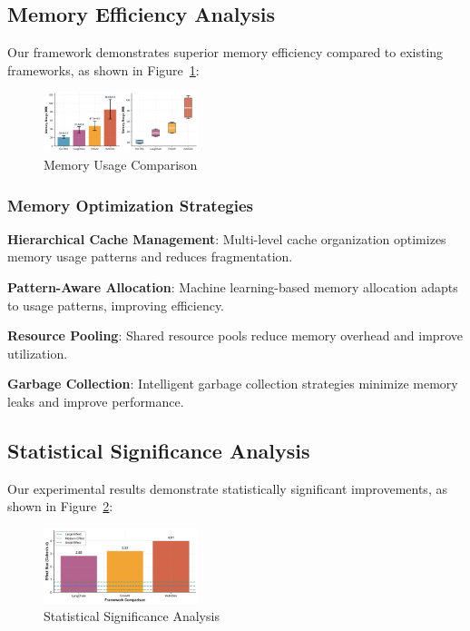 \documentclass[conference]{IEEEtran}
\begin{document}
\subsection{Memory Efficiency Analysis}

Our framework demonstrates superior memory efficiency compared to existing frameworks, as shown in Figure~\ref{fig:memory1}:

\begin{figure}[htbp]
\centering
\includegraphics[width=0.4\textwidth]{figures/images/memory_comparison.png}
\caption{Memory Usage Comparison}
\label{fig:memory1}
\end{figure}

\subsubsection{Memory Optimization Strategies}

\textbf{Hierarchical Cache Management}: Multi-level cache organization optimizes memory usage patterns and reduces fragmentation.

\textbf{Pattern-Aware Allocation}: Machine learning-based memory allocation adapts to usage patterns, improving efficiency.

\textbf{Resource Pooling}: Shared resource pools reduce memory overhead and improve utilization.

\textbf{Garbage Collection}: Intelligent garbage collection strategies minimize memory leaks and improve performance.

\subsection{Statistical Significance Analysis}

Our experimental results demonstrate statistically significant improvements, as shown in Figure~\ref{fig:statistical}:

\begin{figure}[htbp]
\centering
\includegraphics[width=0.4\textwidth]{figures/images/statistical_analysis.png}
\caption{Statistical Significance Analysis}
\label{fig:statistical}
\end{figure}
\end{document}
